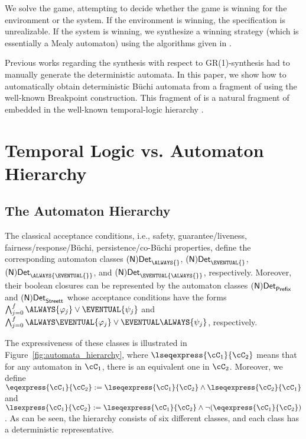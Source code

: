 \documentclass[submission,copyright,creativecommons]{eptcs}
\begin{document}
We solve the game, attempting to decide whether the game is winning for the environment or the system. If the environment is winning, the specification is unrealizable. If the system is winning, we synthesize a winning strategy (which is essentially a Mealy automaton) using the algorithms given in \cite{BGJP07,BGJP07a,JGWB07,PiPS06}. 

\noindent Previous works regarding the synthesis with respect to GR(1)-synthesis had to manually generate the deterministic automata. In this paper, we show how to automatically obtain deterministic Büchi automata from a fragment of \LTL{} using the well-known Breakpoint construction. This fragment of \LTL{} is a natural fragment of \LTL{} embedded in the well-known temporal-logic hierarchy \cite{MaPn87c,ChMP92,MaPn90,MaPn91,Schn01b,Schn03}.













\section{Temporal Logic vs. Automaton Hierarchy}

\subsection{The Automaton Hierarchy}

\noindent The classical acceptance conditions, i.e., safety, guarantee/liveness, fairness/response/Büchi, persistence/co-Büchi properties, define the corresponding automaton classes ${\sf (N)Det}_{\ALWAYS{}}$, ${\sf (N)Det}_{\EVENTUAL{}}$, ${\sf (N)Det}_{\ALWAYS{\EVENTUAL{}}}$, and ${\sf (N)Det}_{\EVENTUAL{\ALWAYS{}}}$, respectively. Moreover, their boolean closures can be represented by the automaton classes ${\sf (N)Det}_{\sf Prefix}$ and ${\sf (N)Det}_{\sf Streett}$ whose acceptance conditions have the forms $\bigwedge_{j=0}^{f} \ALWAYS{\varphi_j} \vee \EVENTUAL{\psi_j}$ and $\bigwedge_{j=0}^{f}\ALWAYS\EVENTUAL{\varphi_j}\vee \EVENTUAL\ALWAYS{\psi_j}$, respectively.

The expressiveness of these classes is illustrated in Figure~\ref{fig:automata_hierarchy}, where $\lseqexpress{\cC_1}{\cC_2}$ means that for any automaton in $\cC_1$, there is an equivalent one in $\cC_2$. Moreover, we define $\eqexpress{\cC_1}{\cC_2} := \lseqexpress{\cC_1}{\cC_2} \wedge \lseqexpress{\cC_2}{\cC_1}$ and $\lsexpress{\cC_1}{\cC_2} := \lseqexpress{\cC_1}{\cC_2} \wedge \neg (\eqexpress{\cC_1}{\cC_2})$. As can be seen, the hierarchy consists of six different classes, and each class has a deterministic representative. 
\end{document}
